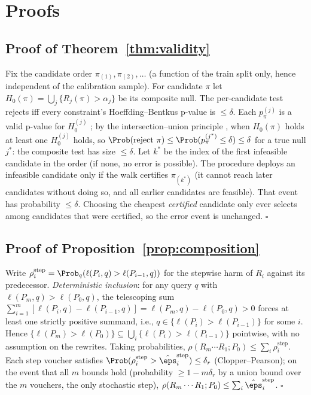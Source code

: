 \section{Proofs}
\label{app:proofs}

\subsection{Proof of Theorem~\ref{thm:validity}}
Fix the candidate order $\pi_{(1)}, \pi_{(2)}, \dots$ (a function of
the train split only, hence independent of the calibration sample).
For candidate $\pi$ let $H_0(\pi) = \bigcup_j \{R_j(\pi) > \alpha_j\}$
be its composite null. The per-candidate test rejects iff every
constraint's Hoeffding--Bentkus p-value is $\le \delta$. Each
$p^{(j)}_\pi$ is a valid p-value for $H_0^{(j)}$
\citep{bentkus2004hoeffding,angelopoulos2021ltt}; by the
intersection--union principle \citep{berger1982iut}, when $H_0(\pi)$
holds at least one $H_0^{(j)}$ holds, so
$\Prob(\text{reject } \pi) \le \Prob(p^{(j^\ast)}_\pi \le \delta) \le
\delta$ for a true null $j^\ast$: the composite test has size
$\le\delta$. Let $k^\ast$ be the index of the first infeasible
candidate in the order (if none, no error is possible). The procedure
deploys an infeasible candidate only if the walk certifies
$\pi_{(k^\ast)}$ (it cannot reach later candidates without doing so,
and all earlier candidates are feasible). That event has probability
$\le \delta$. Choosing the cheapest \emph{certified} candidate only
ever selects among candidates that were certified, so the error event
is unchanged. \hfill$\square$

\subsection{Proof of Proposition~\ref{prop:composition}}
Write $\rho_i^{\mathrm{step}} = \Prob_q(\ell(P_i, q) >
\ell(P_{i-1}, q))$ for the stepwise harm of $R_i$ against its
predecessor. \emph{Deterministic inclusion}: for any query $q$ with
$\ell(P_m, q) > \ell(P_0, q)$, the telescoping sum
$\sum_{i=1}^m [\ell(P_i, q) - \ell(P_{i-1}, q)] =
\ell(P_m, q) - \ell(P_0, q) > 0$ forces at least one strictly positive
summand, i.e., $q \in \{\ell(P_i) > \ell(P_{i-1})\}$ for some $i$.
Hence $\{\ell(P_m) > \ell(P_0)\} \subseteq \bigcup_i \{\ell(P_i) >
\ell(P_{i-1})\}$ pointwise, with no assumption on the rewrites. Taking
probabilities,
$\rho(R_m \cdots R_1; P_0) \le \sum_i \rho_i^{\mathrm{step}}$. Each
step voucher satisfies $\Prob(\rho_i^{\mathrm{step}} >
\hat\eps_i^{\mathrm{step}}) \le \delta_r$ (Clopper--Pearson); on the
event that all $m$ bounds hold (probability $\ge 1 - m\delta_r$ by a
union bound over the $m$ vouchers, the only stochastic step),
$\rho(R_m \cdots R_1; P_0) \le \sum_i \hat\eps_i^{\mathrm{step}}$.
\hfill$\square$

